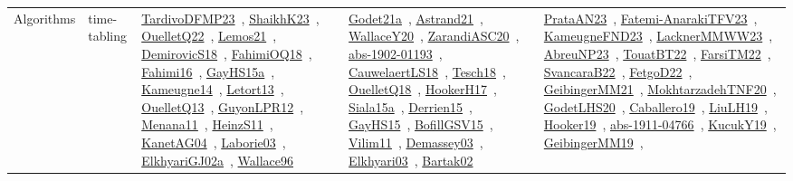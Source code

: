 {\begin{longtable}{lp{3cm}>{\raggedright\arraybackslash}p{6cm}>{\raggedright\arraybackslash}p{6cm}>{\raggedright\arraybackslash}p{8cm}}
Algorithms & time-tabling & \href{works/TardivoDFMP23.pdf}{TardivoDFMP23}~\cite{TardivoDFMP23}, \href{works/ShaikhK23.pdf}{ShaikhK23}~\cite{ShaikhK23}, \href{works/OuelletQ22.pdf}{OuelletQ22}~\cite{OuelletQ22}, \href{works/Lemos21.pdf}{Lemos21}~\cite{Lemos21}, \href{works/DemirovicS18.pdf}{DemirovicS18}~\cite{DemirovicS18}, \href{works/FahimiOQ18.pdf}{FahimiOQ18}~\cite{FahimiOQ18}, \href{works/Fahimi16.pdf}{Fahimi16}~\cite{Fahimi16}, \href{works/GayHS15a.pdf}{GayHS15a}~\cite{GayHS15a}, \href{works/Kameugne14.pdf}{Kameugne14}~\cite{Kameugne14}, \href{works/Letort13.pdf}{Letort13}~\cite{Letort13}, \href{works/OuelletQ13.pdf}{OuelletQ13}~\cite{OuelletQ13}, \href{works/GuyonLPR12.pdf}{GuyonLPR12}~\cite{GuyonLPR12}, \href{works/Menana11.pdf}{Menana11}~\cite{Menana11}, \href{works/HeinzS11.pdf}{HeinzS11}~\cite{HeinzS11}, \href{works/KanetAG04.pdf}{KanetAG04}~\cite{KanetAG04}, \href{works/Laborie03.pdf}{Laborie03}~\cite{Laborie03}, \href{works/ElkhyariGJ02a.pdf}{ElkhyariGJ02a}~\cite{ElkhyariGJ02a}, \href{works/Wallace96.pdf}{Wallace96}~\cite{Wallace96} & \href{works/Godet21a.pdf}{Godet21a}~\cite{Godet21a}, \href{works/Astrand21.pdf}{Astrand21}~\cite{Astrand21}, \href{works/WallaceY20.pdf}{WallaceY20}~\cite{WallaceY20}, \href{works/ZarandiASC20.pdf}{ZarandiASC20}~\cite{ZarandiASC20}, \href{works/abs-1902-01193.pdf}{abs-1902-01193}~\cite{abs-1902-01193}, \href{works/CauwelaertLS18.pdf}{CauwelaertLS18}~\cite{CauwelaertLS18}, \href{works/Tesch18.pdf}{Tesch18}~\cite{Tesch18}, \href{works/OuelletQ18.pdf}{OuelletQ18}~\cite{OuelletQ18}, \href{works/HookerH17.pdf}{HookerH17}~\cite{HookerH17}, \href{works/Siala15a.pdf}{Siala15a}~\cite{Siala15a}, \href{works/Derrien15.pdf}{Derrien15}~\cite{Derrien15}, \href{works/GayHS15.pdf}{GayHS15}~\cite{GayHS15}, \href{works/BofillGSV15.pdf}{BofillGSV15}~\cite{BofillGSV15}, \href{works/Vilim11.pdf}{Vilim11}~\cite{Vilim11}, \href{works/Demassey03.pdf}{Demassey03}~\cite{Demassey03}, \href{works/Elkhyari03.pdf}{Elkhyari03}~\cite{Elkhyari03}, \href{works/Bartak02.pdf}{Bartak02}~\cite{Bartak02} & \href{works/PrataAN23.pdf}{PrataAN23}~\cite{PrataAN23}, \href{works/Fatemi-AnarakiTFV23.pdf}{Fatemi-AnarakiTFV23}~\cite{Fatemi-AnarakiTFV23}, \href{works/KameugneFND23.pdf}{KameugneFND23}~\cite{KameugneFND23}, \href{works/LacknerMMWW23.pdf}{LacknerMMWW23}~\cite{LacknerMMWW23}, \href{works/AbreuNP23.pdf}{AbreuNP23}~\cite{AbreuNP23}, \href{works/TouatBT22.pdf}{TouatBT22}~\cite{TouatBT22}, \href{works/FarsiTM22.pdf}{FarsiTM22}~\cite{FarsiTM22}, \href{works/SvancaraB22.pdf}{SvancaraB22}~\cite{SvancaraB22}, \href{works/FetgoD22.pdf}{FetgoD22}~\cite{FetgoD22}, \href{works/GeibingerMM21.pdf}{GeibingerMM21}~\cite{GeibingerMM21}, \href{works/MokhtarzadehTNF20.pdf}{MokhtarzadehTNF20}~\cite{MokhtarzadehTNF20}, \href{works/GodetLHS20.pdf}{GodetLHS20}~\cite{GodetLHS20}, \href{works/Caballero19.pdf}{Caballero19}~\cite{Caballero19}, \href{works/LiuLH19.pdf}{LiuLH19}~\cite{LiuLH19}, \href{works/Hooker19.pdf}{Hooker19}~\cite{Hooker19}, \href{works/abs-1911-04766.pdf}{abs-1911-04766}~\cite{abs-1911-04766}, \href{works/KucukY19.pdf}{KucukY19}~\cite{KucukY19}, \href{works/GeibingerMM19.pdf}{GeibingerMM19}~\cite{GeibingerMM19}, 
\end{longtable}}
